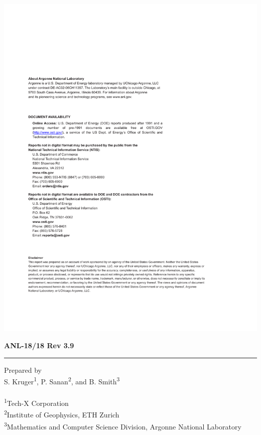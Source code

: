 \vspace*{10pt}
\vspace*{20pt}



\newpage
\centerline{\includegraphics{ArgonneReportTemplate2018Page2}}
\newpage

\hfill {\large {\bf ANL-18/18 Rev 3.9}}

\vspace*{2in}
\vspace*{8pt}
\hrule
\vspace*{8pt}

\vspace*{0.5in}
\noindent Prepared by \\
{S. Kruger\textsuperscript{1}, P. Sanan\textsuperscript{2}, and B. Smith\textsuperscript{3}}\\
\\
\textsuperscript{1}Tech-X Corporation \\
\textsuperscript{2}Institute of Geophysics, ETH Zurich\\
\textsuperscript{3}Mathematics and Computer Science Division, Argonne National Laboratory \\


